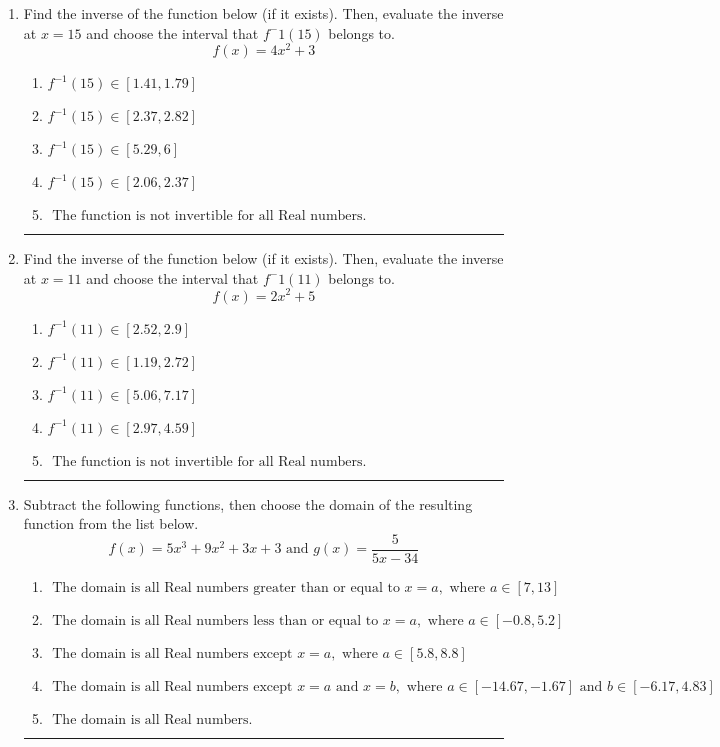 \documentclass[14pt]{extbook}
\newcommand{\litem}[1]{\item#1\hspace*{-1cm}\rule{\textwidth}{0.4pt}}
\begin{document}
\begin{enumerate}
{\begin{enumerate}[label=\Alph*.]
\end{enumerate} }
\litem{
Find the inverse of the function below (if it exists). Then, evaluate the inverse at $x = 15$ and choose the interval that $f^-1(15)$ belongs to.\[ f(x) = 4 x^2 + 3 \]\begin{enumerate}[label=\Alph*.]
\item \( f^{-1}(15) \in [1.41, 1.79] \)
\item \( f^{-1}(15) \in [2.37, 2.82] \)
\item \( f^{-1}(15) \in [5.29, 6] \)
\item \( f^{-1}(15) \in [2.06, 2.37] \)
\item \( \text{ The function is not invertible for all Real numbers. } \)

\end{enumerate} }
\litem{
Find the inverse of the function below (if it exists). Then, evaluate the inverse at $x = 11$ and choose the interval that $f^-1(11)$ belongs to.\[ f(x) = 2 x^2 + 5 \]\begin{enumerate}[label=\Alph*.]
\item \( f^{-1}(11) \in [2.52, 2.9] \)
\item \( f^{-1}(11) \in [1.19, 2.72] \)
\item \( f^{-1}(11) \in [5.06, 7.17] \)
\item \( f^{-1}(11) \in [2.97, 4.59] \)
\item \( \text{ The function is not invertible for all Real numbers. } \)

\end{enumerate} }
\litem{
Subtract the following functions, then choose the domain of the resulting function from the list below.\[ f(x) = 5x^{3} +9 x^{2} +3 x + 3 \text{ and } g(x) = \frac{5}{5x-34} \]\begin{enumerate}[label=\Alph*.]
\item \( \text{ The domain is all Real numbers greater than or equal to } x = a, \text{ where } a \in [7, 13] \)
\item \( \text{ The domain is all Real numbers less than or equal to } x = a, \text{ where } a \in [-0.8, 5.2] \)
\item \( \text{ The domain is all Real numbers except } x = a, \text{ where } a \in [5.8, 8.8] \)
\item \( \text{ The domain is all Real numbers except } x = a \text{ and } x = b, \text{ where } a \in [-14.67, -1.67] \text{ and } b \in [-6.17, 4.83] \)
\item \( \text{ The domain is all Real numbers. } \)

\end{enumerate} }
\end{enumerate}
\end{document}
